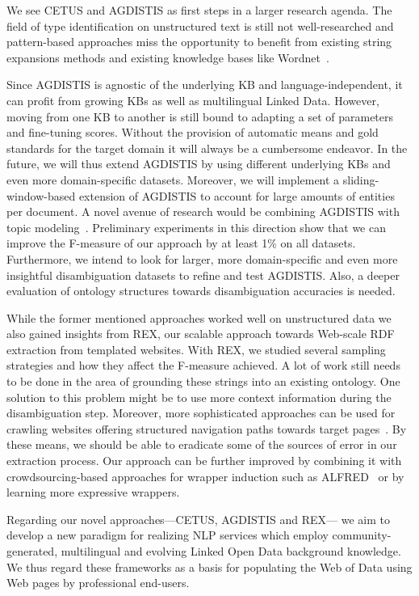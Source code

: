 We see CETUS and AGDISTIS as first steps in a larger research agenda.
The field of type identification on unstructured text is still not well-researched and pattern-based approaches miss the opportunity to benefit from existing string expansions methods and existing knowledge bases like Wordnet~\cite{wordnet}.


Since AGDISTIS is agnostic of the underlying \ac{KB} and language-independent, it can profit from growing \ac{KB}s as well as multilingual Linked Data.
However, moving from one \ac{KB} to another is still bound to adapting a set of parameters and fine-tuning scores. 
Without the provision of automatic means and gold standards for the target domain it will always be a cumbersome endeavor. 
In the future, we will thus extend AGDISTIS by using different underlying \ac{KB}s and even more domain-specific datasets.
Moreover, we will implement a sliding-window-based extension of AGDISTIS to account for large amounts of entities per document.
A novel avenue of research would be combining AGDISTIS with topic modeling~\cite{Blei:2003:LDA:944919.944937}. 
Preliminary experiments in this direction show that we can improve the F-measure of our approach by at least 1\% on all datasets.
Furthermore, we intend to look for larger, more domain-specific and even more insightful disambiguation datasets to refine and test AGDISTIS.
Also, a deeper evaluation of ontology structures towards disambiguation accuracies is needed.

While the former mentioned approaches worked well on unstructured data we also gained insights from REX, our scalable approach towards Web-scale RDF extraction from templated websites. 
With REX, we studied several sampling strategies and how they affect the F-measure achieved.
A lot of work still needs to be done in the area of grounding these strings into an existing ontology.
One solution to this problem might be to use more context information during the disambiguation step.
Moreover, more sophisticated approaches can be used for crawling websites offering structured navigation paths towards target pages~\cite{DBLP:conf/webist/BlancoCM05}. 
By these means, we should be able to eradicate some of the sources of error in our extraction process. 
Our approach can be further improved by combining it with crowdsourcing-based approaches for wrapper induction such as ALFRED~\cite{Crescenzi2013} or by learning more expressive wrappers.


Regarding our novel approaches---CETUS, AGDISTIS and REX--- we aim to develop a new paradigm for realizing \ac{NLP} services which employ community-generated, multilingual and evolving Linked Open Data background knowledge.
We thus regard these frameworks as a basis for populating the Web of Data using Web pages by professional end-users.


